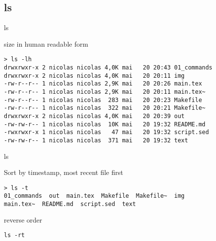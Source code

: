 \subsection{ls}

\begin{frame}[fragile]{ls}
  \begin{exampleblock}{size in human readable form}
    \begin{lstlisting}[showstringspaces=false, basicstyle=\tiny]
> ls -lh
drwxrwxr-x 2 nicolas nicolas 4,0K mai   20 20:43 01_commands
drwxrwxr-x 2 nicolas nicolas 4,0K mai   20 20:11 img
-rw-r--r-- 1 nicolas nicolas 2,9K mai   20 20:26 main.tex
-rw-r--r-- 1 nicolas nicolas 2,9K mai   20 20:11 main.tex~
-rw-r--r-- 1 nicolas nicolas  283 mai   20 20:23 Makefile
-rw-r--r-- 1 nicolas nicolas  322 mai   20 20:21 Makefile~
drwxrwxr-x 2 nicolas nicolas 4,0K mai   20 20:39 out
-rw-rw-r-- 1 nicolas nicolas  10K mai   20 19:32 README.md
-rwxrwxr-x 1 nicolas nicolas   47 mai   20 19:32 script.sed
-rw-rw-r-- 1 nicolas nicolas  371 mai   20 19:32 text
    \end{lstlisting}
  \end{exampleblock}
\end{frame}


\begin{frame}[fragile]{ls}
  \begin{exampleblock}{Sort by timestamp, most recent file first}
    \begin{lstlisting}[showstringspaces=false,basicstyle=\tiny]
> ls -t
01_commands  out  main.tex  Makefile  Makefile~  img  
main.tex~  README.md  script.sed  text
    \end{lstlisting}
  \end{exampleblock}
  \pause

  \begin{exampleblock}{reverse order}
    \begin{lstlisting}[showstringspaces=false]
ls -rt
    \end{lstlisting}
  \end{exampleblock}
\end{frame}
